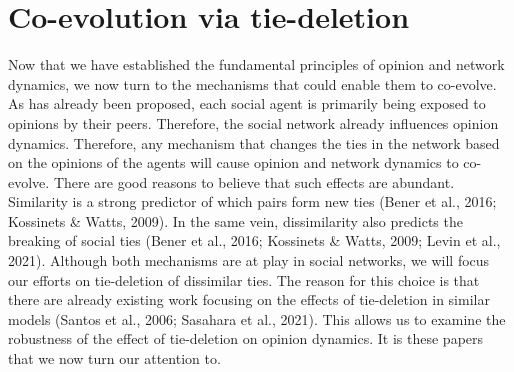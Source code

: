 \documentclass{article}
\begin{document}
\section{Co-evolution via tie-deletion}
Now that we have established the fundamental principles of opinion and network dynamics, we now turn to the mechanisms that could enable them to co-evolve. As has already been proposed, each social agent is primarily being exposed to opinions by their peers. Therefore, the social network already influences opinion dynamics. Therefore, any mechanism that changes the ties in the network based on the opinions of the agents will cause opinion and network dynamics to co-evolve. There are good reasons to believe that such effects are abundant. Similarity is a strong predictor of which pairs form new ties (Bener et al., 2016; Kossinets \& Watts, 2009). In the same vein, dissimilarity also predicts the breaking of social ties (Bener et al., 2016; Kossinets \& Watts, 2009; Levin et al., 2021). Although both mechanisms are at play in social networks, we will focus our efforts on tie-deletion of dissimilar ties. The reason for this choice is that there are already existing work focusing on the effects of tie-deletion in similar models (Santos et al., 2006; Sasahara et al., 2021). This allows us to examine the robustness of the effect of tie-deletion on opinion dynamics. It is these papers that we now turn our attention to.  
\end{document}
